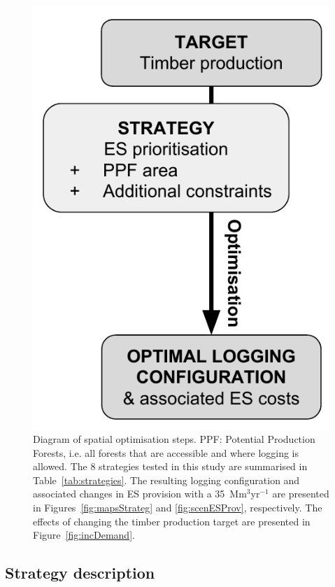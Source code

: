 \documentclass{article}
\begin{document}
\begin{figure}
    \centering
    \includegraphics[width = 0.6\linewidth]{graphs/diagramSpatOptim}
    \caption{Diagram of spatial optimisation steps. PPF: Potential Production Forests, i.e. all forests that are accessible and where logging is allowed. The 8 strategies tested in this study are summarised in Table~\ref{tab:strategies}. The resulting logging configuration and associated changes in ES provision with a 35~Mm$^3$yr$^{-1}$ are presented in Figures~\ref{fig:mapsStrateg} and \ref{fig:scenESProv}, respectively. The effects of changing the timber production target are presented in Figure~\ref{fig:incDemand}.}
    \label{fig:basicDiagram}
\end{figure}

\subsection{Strategy description}
\end{document}
